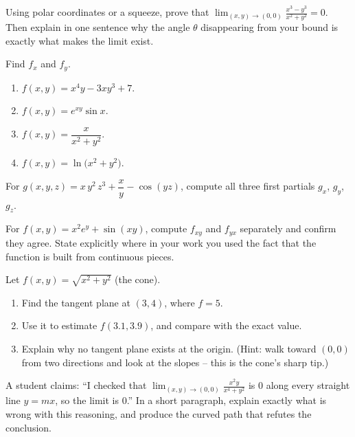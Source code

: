 \begin{exercise}
\label{ch32:exc-exists}
Using polar coordinates or a squeeze, prove that
$\displaystyle\lim_{(x,y)\to(0,0)} \frac{x^3 - y^3}{x^2+y^2} = 0$. Then explain in one sentence
why the angle $\theta$ disappearing from your bound is exactly what makes the limit exist.
\end{exercise}

\begin{exercise}
\label{ch32:exc-partials}
Find $f_x$ and $f_y$.
\begin{enumerate}[label=(\alph*)]
  \item $f(x,y)=x^4 y - 3xy^3 + 7$.
  \item $f(x,y)=e^{xy}\sin x$.
  \item $f(x,y)=\dfrac{x}{x^2+y^2}$.
  \item $f(x,y)=\ln\!\big(x^2 + y^2\big)$.
\end{enumerate}
\end{exercise}

\begin{exercise}
\label{ch32:exc-three}
For $g(x,y,z) = x\,y^2\,z^3 + \dfrac{x}{y} - \cos(yz)$, compute all three first partials
$g_x$, $g_y$, $g_z$.
\end{exercise}

\begin{exercise}
\label{ch32:exc-clairaut}
For $f(x,y)=x^2 e^{y} + \sin(xy)$, compute $f_{xy}$ and $f_{yx}$ separately and confirm they
agree. State explicitly where in your work you used the fact that the function is built from
continuous pieces.
\end{exercise}

\begin{exercise}
\label{ch32:exc-tangent}
Let $f(x,y)=\sqrt{x^2+y^2}$ (the cone).
\begin{enumerate}[label=(\alph*)]
  \item Find the tangent plane at $(3,4)$, where $f=5$.
  \item Use it to estimate $f(3.1, 3.9)$, and compare with the exact value.
  \item Explain why no tangent plane exists at the origin. (Hint: walk toward $(0,0)$ from two
  directions and look at the slopes -- this is the cone's sharp tip.)
\end{enumerate}
\end{exercise}

\begin{exercise}
\label{ch32:exc-concept}
A student claims: ``I checked that
$\displaystyle\lim_{(x,y)\to(0,0)} \frac{x^2 y}{x^4+y^2}$ is $0$ along every straight line
$y=mx$, so the limit is $0$.'' In a short paragraph, explain exactly what is wrong with this
reasoning, and produce the curved path that refutes the conclusion.
\end{exercise}

